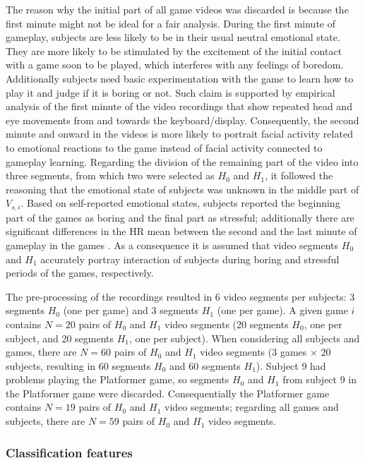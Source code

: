 The reason why the initial part of all game videos was discarded is because the first minute might not be ideal for a fair analysis. During the first minute of gameplay, subjects are less likely to be in their usual neutral emotional state. They are more likely to be stimulated by the excitement of the initial contact with a game soon to be played, which interferes with any feelings of boredom. Additionally subjects need basic experimentation with the game to learn how to play it and judge if it is boring or not. Such claim is supported by empirical analysis of the first minute of the video recordings that show repeated head and eye movements from and towards the keyboard/display. Consequently, the second minute and onward in the videos is more likely to portrait facial activity related to emotional reactions to the game instead of facial activity connected to gameplay learning. Regarding the division of the remaining part of the video into three segments, from which two were selected as $H_0$ and $H_1$, it followed the reasoning that the emotional state of subjects was unknown in the middle part of $V_{s,i}$. Based on self-reported emotional states, subjects reported the beginning part of the games as boring and the final part as stressful; additionally there are significant differences in the HR mean between the second and the last minute of gameplay in the games \parencite{bevilacqua2018changes}. As a consequence it is assumed that video segments $H_0$ and $H_1$ accurately portray interaction of subjects during boring and stressful periods of the games, respectively.

The pre-processing of the recordings resulted in 6 video segments per subjects: 3 segments $H_0$ (one per game) and 3 segments $H_1$ (one per game). A given game $i$ contains $N=20$ pairs of $H_0$ and $H_1$ video segments (20 segments $H_0$, one per subject, and 20 segments $H_1$, one per subject). When considering all subjects and games, there are $N=60$ pairs of $H_0$ and $H_1$ video segments (3 games $\times$ 20 subjects, resulting in 60 segments $H_0$ and 60 segments $H_1$). Subject 9 had problems playing the Platformer game, so segments $H_0$ and $H_1$ from subject 9 in the Platformer game were discarded. Consequentially the Platformer game contains $N=19$ pairs of $H_0$ and $H_1$ video segments; regarding all games and subjects, there are $N=59$ pairs of $H_0$ and $H_1$ video segments.

\subsubsection{Classification features}

